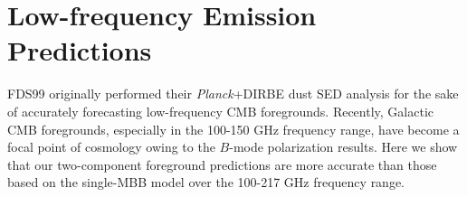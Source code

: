 \documentclass{emulateapj}
\newcommand{\IRAS}{{\it IRAS}}
\newcommand{\PLANCK}{{\it Planck}}
\begin{document}


\section{Low-frequency Emission Predictions}
\label{sec:lofreq}
FDS99 originally performed their \PLANCK+DIRBE dust SED analysis for the sake 
of accurately forecasting low-frequency CMB foregrounds. Recently, Galactic CMB
foregrounds, especially in the 100-150 GHz frequency range, have become a focal
point of cosmology owing to the \cite{bicep2} $B$-mode polarization results. 
Here we show that our two-component foreground predictions are more accurate 
than those based on the \cite{planckdust} single-MBB model over the 100-217 GHz
frequency range.

\begin{figure*}
\begin{center}
\caption{\label{fig:lofreq} Comparison between low-frequency thermal dust 
emission predictions from our best-fit two-component model (Table 
\ref{tab:global}, model 2) and those of \cite{planckdust}. The top row shows
scatterplots of the \cite{planckdust} predictions versus observed \PLANCK~100 
GHz (left), \PLANCK~143 GHz (center) and \PLANCK~217 GHz (right). The bottom 
row shows scatterplots of the corresponding two-component predictions versus
\PLANCK~observations. In all cases, the blue line indicates the best-fit linear
relationship, while the red line represents a perfect match between predictions
and observations. The lines of best-fit illustrate that the single-MBB model 
systematically underpredicts emission (in the multiplicative sense) by 18.8\%, 
12.6\% and 7.9\% at 100, 143 and 217 GHz respectively. On the other hand, by 
the same metric, the two-component model predictions at 100-217 GHz are always 
accurate to within $\le$2.2\%.}
\end{center}
\end{figure*}
\end{document}
